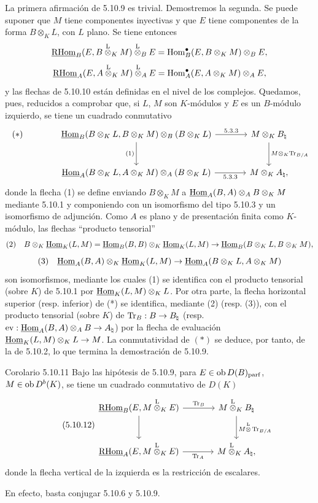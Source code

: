 La primera afirmación de 5.10.9 es trivial. Demostremos la segunda. Se puede suponer que $M$ tiene componentes inyectivas y que $E$ tiene componentes de la forma $B\otimes_KL$, con $L$ plano. Se tiene entonces
\[
\underline{\mathrm{RHom}}_B(E,B\overset{\mathrm L}{\otimes}_KM)\overset{\mathrm L}{\otimes}_BE=\operatorname{Hom}_B^\bullet(E,B\otimes_KM)\otimes_BE,
\]
\[
\underline{\mathrm{RHom}}_A(E,A\overset{\mathrm L}{\otimes}_KM)\overset{\mathrm L}{\otimes}_AE=\operatorname{Hom}_A^\bullet(E,A\otimes_KM)\otimes_AE,
\]
y las flechas de 5.10.10 están definidas en el nivel de los complejos. Quedamos, pues, reducidos a comprobar que, si $L$, $M$ son $K$-módulos y $E$ es un $B$-módulo izquierdo, se tiene un cuadrado conmutativo
\[
\begin{tikzcd}[column sep=large,row sep=large]
|[alias=star]| {(*)} & \uHom_B(B\otimes_KL,B\otimes_KM)\otimes_B(B\otimes_KL) \arrow[r,"5.3.3"] \arrow[d,"(1)"'] & M\otimes_KB_\natural \arrow[d,"M\otimes_K\Tr_{B/A}"]\\
& \uHom_A(B\otimes_KL,A\otimes_KM)\otimes_A(B\otimes_KL) \arrow[r,"5.3.3"'] & M\otimes_KA_\natural,
\end{tikzcd}
\]
donde la flecha (1) se define enviando $B\otimes_KM$ a $\underline{\operatorname{Hom}}_A(B,A)\otimes_AB\otimes_KM$ mediante 5.10.1 y componiendo con un isomorfismo del tipo 5.10.3 y un isomorfismo de adjunción. Como $A$ es plano y de presentación finita como $K$-módulo, las flechas ``producto tensorial''
\[
\text{(2)}\quad B\otimes_K\underline{\operatorname{Hom}}_K(L,M)=\underline{\operatorname{Hom}}_B(B,B)\otimes_K\underline{\operatorname{Hom}}_K(L,M)\to\underline{\operatorname{Hom}}_B(B\otimes_KL,B\otimes_KM),
\]
\[
\text{(3)}\quad \underline{\operatorname{Hom}}_A(B,A)\otimes_K\underline{\operatorname{Hom}}_K(L,M)\to\underline{\operatorname{Hom}}_A(B\otimes_KL,A\otimes_KM)
\]
son isomorfismos, mediante los cuales (1) se identifica con el producto tensorial (sobre $K$) de 5.10.1 por $\underline{\operatorname{Hom}}_K(L,M)\otimes_KL$. Por otra parte, la flecha horizontal superior (resp. inferior) de (*) se identifica, mediante (2) (resp. (3)), con el producto tensorial (sobre $K$) de $\operatorname{Tr}_B:B\to B_\natural$ (resp. $\mathrm{ev}:\underline{\operatorname{Hom}}_A(B,A)\otimes_AB\to A_\natural$) por la flecha de evaluación $\underline{\operatorname{Hom}}_K(L,M)\otimes_KL\to M$. La conmutatividad de $(*)$ se deduce, por tanto, de la de 5.10.2, lo que termina la demostración de 5.10.9.

\begin{statement}{Corolario 5.10.11}
Bajo las hipótesis de 5.10.9, para $E\in\operatorname{ob} D(B)_{\mathrm{parf}}$, $M\in\operatorname{ob} D^b(K)$, se tiene un cuadrado conmutativo de $D(K)$
\begin{equation}\tag{5.10.12}
\begin{tikzcd}[column sep=large,row sep=large]
\uRHom_B(E,M\lten_KE) \arrow[r,"\Tr_B"] \arrow[d] & M\lten_KB_\natural \arrow[d,"M\lten\Tr_{B/A}"]\\
\uRHom_A(E,M\lten_KE) \arrow[r,"\Tr_A"'] & M\lten_KA_\natural,
\end{tikzcd}
\end{equation}
donde la flecha vertical de la izquierda es la restricción de escalares.
\end{statement}

En efecto, basta conjugar 5.10.6 y 5.10.9.
